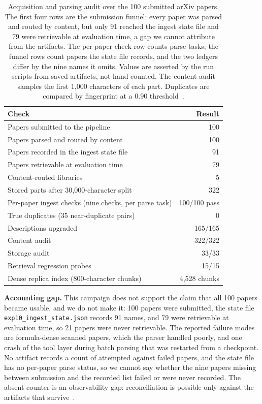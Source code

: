 \begin{table}[t]
\centering
\small
\setlength{\tabcolsep}{4pt}
\caption{Acquisition and parsing audit over the 100 submitted arXiv papers.
The first four rows are the submission funnel: every paper was parsed and
routed by content, but only 91 reached the ingest state file and 79 were
retrievable at evaluation time, a gap we cannot attribute from the artifacts.
The per-paper check row counts parse tasks; the funnel rows count papers the
state file records, and the two ledgers differ by the nine names it omits.
Values are asserted by the run scripts from saved artifacts, not hand-counted.
The content audit samples the first 1{,}000 characters of each part. Duplicates
are compared by fingerprint at a 0.90 threshold~\cite{manku-near-dup-2007}.}
\label{tab:acq-pipeline}
\begin{tabular}{@{}lr@{}}
\toprule
Check & Result \\
\midrule
Papers submitted to the pipeline & 100 \\
Papers parsed and routed by content & 100 \\
Papers recorded in the ingest state file & 91 \\
Papers retrievable at evaluation time & 79 \\
Content-routed libraries & 5 \\
Stored parts after 30{,}000-character split & 322 \\
Per-paper ingest checks (nine checks, per parse task) & 100/100 pass \\
True duplicates (35 near-duplicate pairs) & 0 \\
Descriptions upgraded & 165/165 \\
Content audit & 322/322 \\
Storage audit & 33/33 \\
Retrieval regression probes & 15/15 \\
Dense replica index (800-character chunks) & 4{,}528 chunks \\
\bottomrule
\end{tabular}
\end{table}

\textbf{Accounting gap.} This campaign does not support the claim that all 100 papers became usable, and we do not make it: 100 papers were submitted, the state file \texttt{exp10\allowbreak\_ingest\allowbreak\_state.json} records 91 names, and 79 were retrievable at evaluation time, so 21 papers were never retrievable. The reported failure modes are formula-dense scanned papers, which the parser handled poorly, and one crash of the tool layer during batch parsing that was restarted from a checkpoint. No artifact records a count of attempted against failed papers, and the state file has no per-paper parse status, so we cannot say whether the nine papers missing between submission and the recorded list failed or were never recorded. The absent counter is an observability gap: reconciliation is possible only against the artifacts that survive~\cite{missier-prov-2013}.

